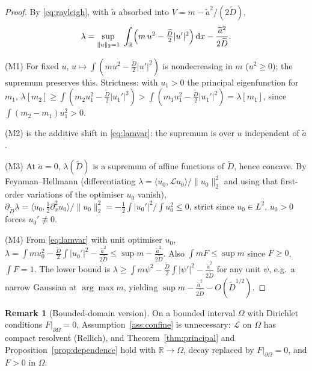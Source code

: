 \documentclass{amsart}
\theoremstyle{definition}
\newtheorem{remark}{Remark}
\newcommand{\R}{\mathbb{R}}
\newcommand{\dd}{\,\mathrm{d}}
\begin{document}
\begin{proof}
By \eqref{eq:rayleigh}, with $\widetilde a$ absorbed into $V=m-\widetilde a^2/(2\widetilde D)$,
\begin{equation}\label{eq:lamvar}
\lambda=\sup_{\|u\|_2=1}\ \int_\R\Bigl(m\,u^2-\tfrac{\widetilde D}{2}|u'|^2\Bigr)\dd x
-\frac{\widetilde a^2}{2\widetilde D}.
\end{equation}

(M1) For fixed $u$, $u\mapsto\int(mu^2-\frac{\widetilde D}{2}|u'|^2)$ is nondecreasing in $m$
($u^2\ge0$); the supremum preserves this. Strictness: with $u_1>0$ the principal eigenfunction
for $m_1$, $\lambda[m_2]\ge\int(m_2u_1^2-\frac{\widetilde D}{2}|u_1'|^2)
>\int(m_1u_1^2-\frac{\widetilde D}{2}|u_1'|^2)=\lambda[m_1]$, since $\int(m_2-m_1)u_1^2>0$.

(M2) is the additive shift in \eqref{eq:lamvar}: the supremum is over $u$ independent of
$\widetilde a$.

(M3) At $\widetilde a=0$, $\lambda(\widetilde D)$ is a supremum of affine functions of
$\widetilde D$, hence concave. By Feynman--Hellmann (differentiating
$\lambda=\langle u_0,\mathcal L u_0\rangle/\|u_0\|_2^2$ and using that first-order variations
of the optimiser $u_0$ vanish), $\partial_{\widetilde D}\lambda
=\langle u_0,\frac12\partial_x^2u_0\rangle/\|u_0\|_2^2=-\frac12\int|u_0'|^2/\!\int u_0^2\le0$,
strict since $u_0\in L^2$, $u_0>0$ forces $u_0'\not\equiv0$.

(M4) From \eqref{eq:lamvar} with unit optimiser $u_0$,
$\lambda=\int mu_0^2-\frac{\widetilde D}{2}\int|u_0'|^2-\frac{\widetilde a^2}{2\widetilde D}
\le\sup m-\frac{\widetilde a^2}{2\widetilde D}$. Also $\int mF\le\sup m$ since $F\ge0$,
$\int F=1$. The lower bound is $\lambda\ge\int m\psi^2-\frac{\widetilde D}{2}\int|\psi'|^2
-\frac{\widetilde a^2}{2\widetilde D}$ for any unit $\psi$, e.g.\ a narrow Gaussian at
$\arg\max m$, yielding $\sup m-\frac{\widetilde a^2}{2\widetilde D}-O(\widetilde D^{1/2})$.
\end{proof}

\begin{remark}[Bounded-domain version]\label{rem:bounded}
On a bounded interval $\Omega$ with Dirichlet conditions $F|_{\partial\Omega}=0$,
Assumption~\ref{ass:confine} is unnecessary: $\mathcal L$ on $\Omega$ has compact resolvent
(Rellich), and Theorem~\ref{thm:principal} and Proposition~\ref{prop:dependence} hold with
$\R\to\Omega$, decay replaced by $F|_{\partial\Omega}=0$, and $F>0$ in $\Omega$.
\end{remark}
\end{document}
